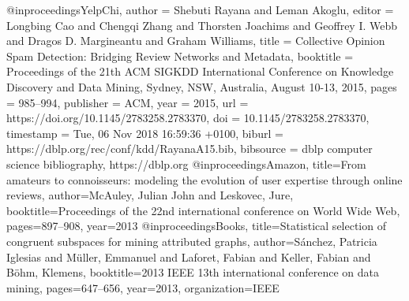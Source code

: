 @inproceedings{YelpChi,
  author    = {Shebuti Rayana and
               Leman Akoglu},
  editor    = {Longbing Cao and
               Chengqi Zhang and
               Thorsten Joachims and
               Geoffrey I. Webb and
               Dragos D. Margineantu and
               Graham Williams},
  title     = {Collective Opinion Spam Detection: Bridging Review Networks and Metadata},
  booktitle = {Proceedings of the 21th {ACM} {SIGKDD} International Conference on
               Knowledge Discovery and Data Mining, Sydney, NSW, Australia, August
               10-13, 2015},
  pages     = {985--994},
  publisher = {{ACM}},
  year      = {2015},
  url       = {https://doi.org/10.1145/2783258.2783370},
  doi       = {10.1145/2783258.2783370},
  timestamp = {Tue, 06 Nov 2018 16:59:36 +0100},
  biburl    = {https://dblp.org/rec/conf/kdd/RayanaA15.bib},
  bibsource = {dblp computer science bibliography, https://dblp.org}
}
@inproceedings{Amazon,
  title={From amateurs to connoisseurs: modeling the evolution of user expertise through online reviews},
  author={McAuley, Julian John and Leskovec, Jure},
  booktitle={Proceedings of the 22nd international conference on World Wide Web},
  pages={897--908},
  year={2013}
}
@inproceedings{Books,
  title={Statistical selection of congruent subspaces for mining attributed graphs},
  author={S{\'a}nchez, Patricia Iglesias and M{\"u}ller, Emmanuel and Laforet, Fabian and Keller, Fabian and B{\"o}hm, Klemens},
  booktitle={2013 IEEE 13th international conference on data mining},
  pages={647--656},
  year={2013},
  organization={IEEE}
}


